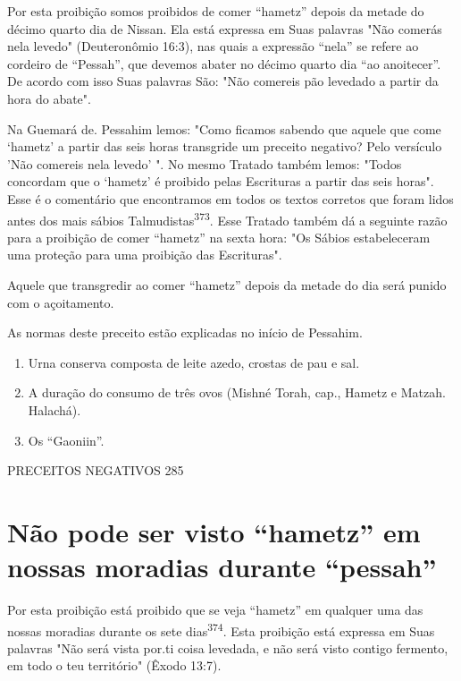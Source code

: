 Por esta proibição somos proibidos de comer ``hametz'' depois da metade do
décimo quarto dia de Nissan. Ela está expressa em Suas palavras "Não
comerás nela levedo" (Deuteronômio 16:3), nas quais a expressão ``nela''
se refere ao cordeiro de ``Pessah'', que devemos abater no décimo quarto
dia ``ao anoitecer''. De acordo com isso Suas palavras São: "Não comereis
pão leveda­do a partir da hora do abate".

Na Guemará de. Pessahim lemos: "Como ficamos sabendo que aque­le que
come `hametz' a partir das seis horas transgride um preceito negativo?
Pelo versículo 'Não comereis nela levedo' ". No mesmo Tratado também
le­mos: "Todos concordam que o `hametz' é proibido pelas Escrituras a
partir das seis horas". Esse é o comentário que encontramos em todos os
textos corretos que foram lidos antes dos mais sábios
Talmudistas\textsuperscript{373}. Esse Tratado também dá a seguinte
razão para a proibição de comer ``hametz'' na sexta hora: "Os Sábios
estabeleceram uma proteção para uma proibição das Escrituras".

Aquele que transgredir ao comer ``hametz'' depois da metade do dia será
punido com o açoitamento.


As normas deste preceito estão explicadas no início de Pessahim.

\begin{enumerate}
\def\labelenumi{\arabic{enumi}.}
\setcounter{enumi}{370}
\item
 
 Urna conserva composta de leite azedo, crostas de pau e sal.
 
\item
 
 A duração do consumo de três ovos (Mishné Torah, cap., Hametz e
 Matzah. Halachá).
 
\item
 
 Os ``Gaoniin''.
 
\end{enumerate}


PRECEITOS NEGATIVOS 285

\section{Não pode ser visto ``hametz'' em nossas moradias durante ``pessah''}

Por esta proibição está proibido que se veja ``hametz'' em qualquer uma
das nossas moradias durante os sete dias\textsuperscript{374}. Esta
proibição está expressa em Suas palavras "Não será vista por.ti coisa
levedada, e não será visto contigo fermento, em todo o teu território"
(Êxodo 13:7).

